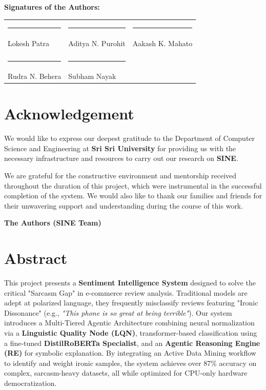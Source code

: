 \documentclass[11pt,oneside]{scrbook}
\begin{document}
\vspace{2.5cm}

\noindent
\textbf{Signatures of the Authors:}

\vspace{1.5cm}

\begin{center}
\begin{tabular}{p{5cm} p{5cm} p{5cm}}
    \rule{4cm}{0.4pt} & \rule{4cm}{0.4pt} & \rule{4cm}{0.4pt} \\
    Lokesh Patra & Aditya N. Purohit & Aakash K. Mahato \\
    \\[1.5cm]
    \rule{4cm}{0.4pt} & \rule{4cm}{0.4pt} & \\
    Rudra N. Behera & Subham Nayak &
\end{tabular}
\end{center}

\cleardoublepage
\chapter*{Acknowledgement}
We would like to express our deepest gratitude to the Department of Computer Science and Engineering at \textbf{Sri Sri University} for providing us with the necessary infrastructure and resources to carry out our research on \textbf{SINE}.

We are grateful for the constructive environment and mentorship received throughout the duration of this project, which were instrumental in the successful completion of the system. We would also like to thank our families and friends for their unwavering support and understanding during the course of this work.

\vspace{2cm}
\begin{flushright}
    \textbf{The Authors (SINE Team)}
\end{flushright}

\chapter*{Abstract}
This project presents a \textbf{Sentiment Intelligence System} designed to solve the critical "Sarcasm Gap" in e-commerce review analysis. Traditional models are adept at polarized language, they frequently misclassify reviews featuring "Ironic Dissonance" (e.g., \textit{"This phone is so great at being terrible"}). Our system introduces a Multi-Tiered Agentic Architecture combining neural normalization via a \textbf{Linguistic Quality Node (LQN)}, transformer-based classification using a fine-tuned \textbf{DistilRoBERTa Specialist}, and an \textbf{Agentic Reasoning Engine (RE)} for symbolic explanation. By integrating an Active Data Mining workflow to identify and weight ironic samples, the system achieves over 87\% accuracy on complex, sarcasm-heavy datasets, all while optimized for CPU-only hardware democratization.
\end{document}

